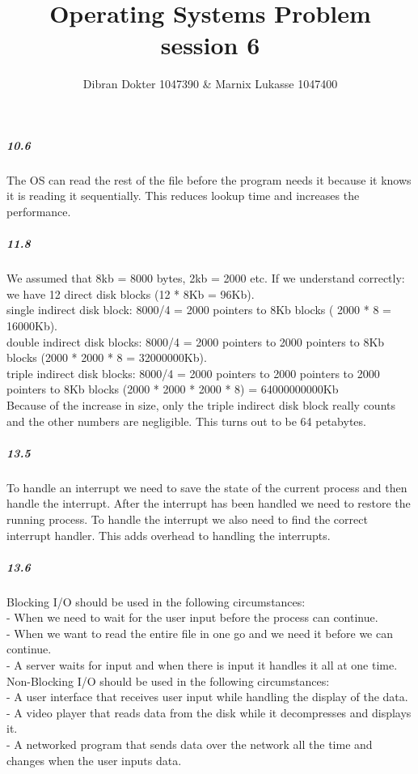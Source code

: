 \documentclass[]{article}
\title{Operating Systems Problem session 6}
\author{Dibran Dokter 1047390 \& Marnix Lukasse 1047400}
\begin{document}
\maketitle

\subparagraph*{10.6}

The OS can read the rest of the file before the program needs it because it knows it is reading it sequentially. This reduces lookup time and increases the performance.

\subparagraph*{11.8}

We assumed that 8kb = 8000 bytes, 2kb = 2000 etc. If we understand correctly: we have 12 direct disk blocks (12 * 8Kb = 96Kb).\\
single indirect disk block: 8000/4 = 2000 pointers to 8Kb blocks ( 2000 * 8 = 16000Kb).\\
double indirect disk blocks: 8000/4 = 2000 pointers to 2000 pointers to 8Kb blocks (2000 * 2000 * 8 = 32000000Kb).\\
triple indirect disk blocks: 8000/4 = 2000 pointers to 2000 pointers to 2000 pointers to 8Kb blocks (2000 * 2000 * 2000 * 8) = 64000000000Kb\\

Because of the increase in size, only the triple indirect disk block really counts and the other numbers are negligible. This turns out to be 64 petabytes.

\subparagraph*{13.5}

To handle an interrupt we need to save the state of the current process and then handle the interrupt. After the interrupt has been handled we need to restore the running process.
To handle the interrupt we also need to find the correct interrupt handler. This adds overhead to handling the interrupts.

\subparagraph*{13.6}

Blocking I/O should be used in the following circumstances:\\
- When we need to wait for the user input before the process can continue.\\
- When we want to read the entire file in one go and we need it before we can continue.\\
- A server waits for input and when there is input it handles it all at one time.\\

Non-Blocking I/O should be used in the following circumstances:\\
- A user interface that receives user input while handling the display of the data.\\
- A video player that reads data from the disk while it decompresses and displays it.\\
- A networked program that sends data over the network all the time and changes when the user inputs data.\\
\end{document}
